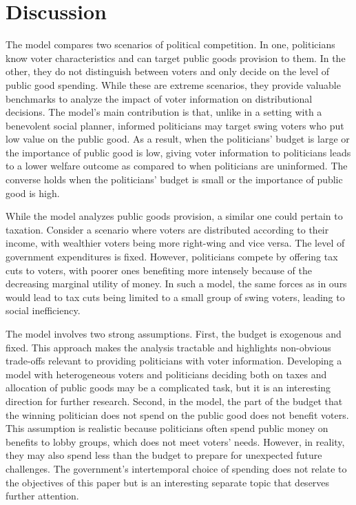 \documentclass[12pt,english]{article}
\begin{document}
\section{Discussion} \label{sect-concl}

The model compares two scenarios of political competition. In one, politicians know voter characteristics and can target public goods provision to them. In the other, they do not distinguish between voters and only decide on the level of public good spending. While these are extreme scenarios, they provide valuable benchmarks to analyze the impact of voter information on distributional decisions. The model's main contribution is that, unlike in a setting with a benevolent social planner, informed politicians may target swing voters who put low value on the public good. As a result, when the politicians' budget is large or the importance of public good is low, giving voter information to politicians leads to a lower welfare outcome as compared to when politicians are uninformed. The converse holds when the politicians' budget is small or the importance of public good is high. 

While the model analyzes public goods provision, a similar one could pertain to taxation. Consider a scenario where voters are distributed according to their income, with wealthier voters being more right-wing and vice versa. The level of government expenditures is fixed. However, politicians compete by offering tax cuts to voters, with poorer ones benefiting more intensely because of the decreasing marginal utility of money. In such a model, the same forces as in ours would lead to tax cuts being limited to a small group of swing voters, leading to social inefficiency. 

The model involves two strong assumptions. First, the budget is exogenous and fixed. This approach makes the analysis tractable and highlights non-obvious trade-offs relevant to providing politicians with voter information. Developing a model with heterogeneous voters and politicians deciding both on taxes and allocation of public goods may be a complicated task, but it is an interesting direction for further research. Second, in the model, the part of the budget that the winning politician does not spend on the public good does not benefit voters. This assumption is realistic because politicians often spend public money on benefits to lobby groups, which does not meet voters' needs. However, in reality, they may also spend less than the budget to prepare for unexpected future challenges. The government's intertemporal choice of spending does not relate to the objectives of this paper but is an interesting separate topic that deserves further attention. 
\end{document}
